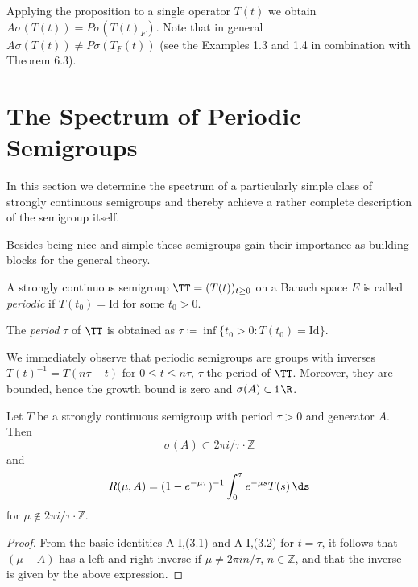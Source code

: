 \newpage
Applying the proposition to a single operator $T(t)$ we obtain\\ $A\sigma(T(t)) = P\sigma(T(t)_{F})$.
Note that in general $A\sigma(T(t)) \neq P\sigma(T_{F}(t))$ (see the Examples 1.3 and 1.4 in combination with Theorem 6.3).

\section{The Spectrum of Periodic Semigroups}\label{sec:a3-5}
In this section we determine the spectrum of a particularly simple class of strongly continuous semigroups and thereby achieve a rather complete description of the semigroup itself.

Besides being nice and simple these semigroups gain their importance as building blocks for the general theory.

\begin{definition}\label{def:a3-5.1}
A strongly continuous semigroup $\TT = (T(t))_{t \geq 0}$ on a Banach space $E$ is called \emph{periodic} if $T(t_{0}) = \text{Id}$ for some $t_{0} > 0$.

The \emph{period} $\tau$ of $\TT$ is obtained as $\tau \coloneqq \inf\{t_{0} > 0 \colon T(t_{0}) = \text{Id}\}$.
\end{definition}
We immediately observe that periodic semigroups are groups with inverses \\
$T(t)^{-1} = T(n\tau-t)$ for $0 \leq t \leq n\tau$, $\tau$ the period of $\TT$.
Moreover, they are bounded, hence the growth bound is zero and $\sigma(A) \subset \mathrm{i}\,\R$.

\begin{lemma}\label{lem:a3-5.2}

Let $T$ be a strongly continuous semigroup with period $\tau > 0$ and generator $A$.
Then
\[
\sigma(A) \subset 2\pi i/\tau\cdot\mathbb{Z}
\]
and
\begin{equation}\label{eq:a3-5.1}
R(\mu,A) = (1-e^{-\mu\tau})^{-1} \int_{0}^{\tau}e^{-\mu s}T(s) \, \ds
\end{equation}
for $\mu \notin 2\pi i/\tau\cdot\mathbb{Z}$.
\end{lemma}

\begin{proof}
From the basic identities A-I,(3.1) and A-I,(3.2) for $t = \tau$, it follows that $(\mu - A)$ has a left and right inverse if $\mu \neq 2\pi in/\tau$, $n \in \mathbb{Z}$, and that the inverse is given by the above expression.
\end{proof}

